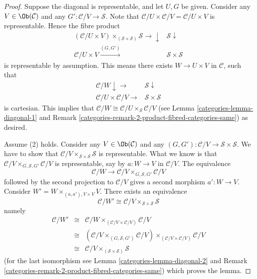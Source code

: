 \begin{proof}

Suppose the diagonal is representable, and let $U, G$ be given.
Consider any $V \in \Ob(\mathcal{C})$ and any
$G' : \mathcal{C}/V \to \mathcal{S}$.
Note that $\mathcal{C}/U \times \mathcal{C}/V = \mathcal{C}/U \times V$
is representable. Hence the fibre product
$$
\begin{array}{cc}(\mathcal{C}/U \times V)
\times_{(\mathcal{S} \times \mathcal{S})}
\mathcal{S}
\longrightarrow\downarrow & \mathcal{S} \downarrow \\ \mathcal{C}/U \times V \overset{(G, G')}{\longrightarrow} & \mathcal{S} \times \mathcal{S}\end{array}
$$
is representable by assumption.
This means there exists $W \to U \times V$ in $\mathcal{C}$,
such that
$$
\begin{array}{cc}\mathcal{C}/W \downarrow\longrightarrow & \mathcal{S} \downarrow \\ \mathcal{C}/U \times \mathcal{C}/V \longrightarrow & \mathcal{S} \times \mathcal{S}\end{array}
$$
is cartesian. This implies that
$\mathcal{C}/W \cong \mathcal{C}/U \times_\mathcal{S} \mathcal{C}/V$
(see Lemma \ref{categories-lemma-diagonal-1} and
Remark \ref{categories-remark-2-product-fibred-categories-same})
as desired.

\medskip\noindent
Assume (2) holds. Consider any $V \in \Ob(\mathcal{C})$
and any $(G, G') : \mathcal{C}/V \to \mathcal{S} \times \mathcal{S}$.
We have to show that
$\mathcal{C}/V \times_{\mathcal{S} \times \mathcal{S}} \mathcal{S}$
is representable. What we know is that
$\mathcal{C}/V \times_{G, \mathcal{S}, G'} \mathcal{C}/V$
is representable, say by $a : W \to V$ in $\mathcal{C}/V$.
The equivalence
$$
\mathcal{C}/W \to \mathcal{C}/V \times_{G, \mathcal{S}, G'} \mathcal{C}/V
$$
followed by the second projection to $\mathcal{C}/V$ gives a
second morphism $a' : W \to V$. Consider
$W' = W \times_{(a, a'), V \times V} V$.
There exists an equivalence
$$
\mathcal{C}/W' \cong
\mathcal{C}/V \times_{\mathcal{S} \times \mathcal{S}} \mathcal{S}
$$
namely
\begin{eqnarray*}
\mathcal{C}/W' & \cong &
\mathcal{C}/W \times_{(\mathcal{C}/V \times \mathcal{C}/V)} \mathcal{C}/V \\
& \cong &
\left(\mathcal{C}/V \times_{(G, \mathcal{S}, G')} \mathcal{C}/V\right)
\times_{(\mathcal{C}/V \times \mathcal{C}/V)} \mathcal{C}/V \\
& \cong &
\mathcal{C}/V \times_{(\mathcal{S} \times \mathcal{S})} \mathcal{S}
\end{eqnarray*}
(for the last isomorphism see Lemma \ref{categories-lemma-diagonal-2} and
Remark \ref{categories-remark-2-product-fibred-categories-same})
which proves the lemma.
\end{proof}

